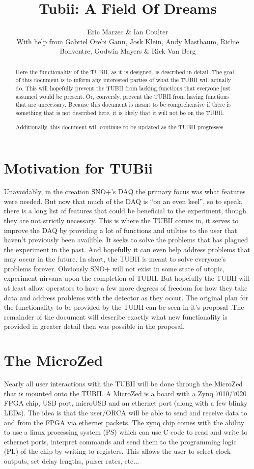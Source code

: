 \documentclass[11pt,a4paper]{article}
\title{Tubii: A Field Of Dreams}
\author{Eric Marzec \& Ian Coulter\\ With help from Gabriel Orebi Gann, Josk Klein, Andy Mastbaum, Richie Bonventre, Godwin Mayers \& Rick Van Berg}
\begin{document}
\maketitle
\begin{abstract}
Here the functionality of the TUBII, as it is designed, is described in detail. The goal of this document is to inform any interested parties of what the TUBII will actually do. This will hopefully prevent the TUBII from lacking functions that everyone just assumed would be present. Or, conversly, prevent the TUBII from having functions that are unecessary. Because this document is meant to be comprehensive if there is something that is not described here, it is likely that it will not be on the TUBII. 

Additionally, this document will continue to be updated as the TUBII progresses.
\end{abstract}
\section{Motivation for TUBii}
Unavoidably, in the creation SNO+'s DAQ the primary focus was what features were needed. But now that much of the DAQ is ``on an even keel'', so to speak, there is a long list of features that could be beneficial to the experiment, though they are not strictly necessary. This is where the TUBII comes in, it serves to improve the DAQ by providing a lot of functions and utilties to the user that haven't previously been availible. It seeks to solve the problems that has plagued the experiment in the past. And hopefully it can even help address problems that may occur in the future. In short, the TUBII is meant to solve everyone's problems forever. Obviously SNO+ will not exist in some state of utopic, experiment nirvana upon the completion of TUBII. But hopefully the TUBII will at least allow operators to have a few more degrees of freedom for how they take data and address problems with the detector as they occur. The original plan for the functionality to be provided by the TUBII can be seen in it's proposal \cite{TubiiPlanDocument}.The remainder of the document will describe exactly what new functionality is provided in greater detail then was possible in the proposal.

\section{The MicroZed}

Nearly all user interactions with the TUBII will be done through the MicroZed that is mounted onto the TUBII. A MicroZed is a board with a Zynq 7010/7020 FPGA chip, USB port, microUSB and an ethernet port (along with a few blinky LEDs). The idea is that the user/ORCA will be able to send and receive data to and from the FPGA via ethernet packets. The zynq chip comes with the ability to use a linux processing system (PS) which can use C code to read and write to ethernet ports, interpret commands and send them to the programming logic (PL) of the chip by writing to registers. This allows the user to select clock outputs, set delay lengths, pulser rates, etc...
\end{document}

